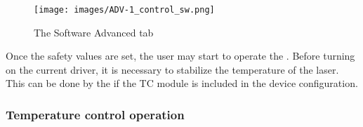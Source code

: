 \begin{figure}[h]
    \centering
    \texttt{[image: images/ADV-1\_control\_sw.png]}
    \caption{The \SoftwareType Software Advanced tab}
    \label{fig:sw_adv_tab}
\end{figure}

Once the safety values are set, the user may start to operate the \QubeModel .
\newline Before turning on the current driver, it is necessary to stabilize the temperature of the laser. This can be done by the \QubeModel  if the TC module is included in the device configuration.





\subsubsection{Temperature control operation}   \label{TC_operation_chapter}
